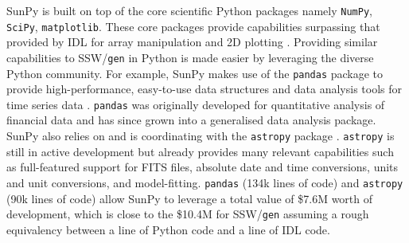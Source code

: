SunPy is built on top of the core scientific Python packages namely 
\texttt{NumPy}, \texttt{SciPy}, \texttt{matplotlib}. These core packages 
provide capabilities surpassing that provided by IDL for array manipulation and 
2D plotting \citep{greenfield2011}. Providing similar capabilities to SSW/\texttt{gen} 
in Python is made easier by leveraging the diverse Python community. For 
example, SunPy makes use of the \texttt{pandas} package to provide 
high-performance, easy-to-use data structures and data analysis tools for time 
series data \citep{mckinney2012}. \texttt{pandas} was originally developed for 
quantitative analysis of financial data and has since grown into a generalised 
data analysis package. SunPy also relies on and is coordinating with the 
\texttt{astropy} package \citep{theastropycollaboration2013}. \texttt{astropy} is still in 
active development but already provides many relevant capabilities such as 
full-featured support for FITS files, absolute date and time conversions, 
units and unit conversions, and model-fitting. \texttt{pandas} (134k lines of code) 
and \texttt{astropy} (90k lines of code) allow SunPy to leverage a total value of \$7.6M 
worth of development, which is close to the \$10.4M for SSW/\texttt{gen} assuming a rough 
equivalency between a line of Python code and a line of IDL code. 
